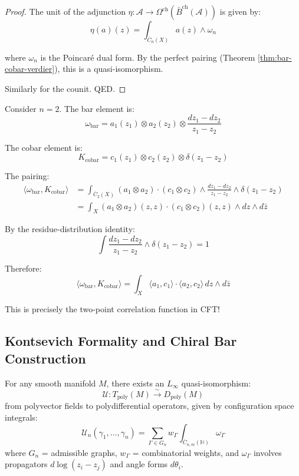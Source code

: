 \begin{proof}
The unit of the adjunction $\eta: \mathcal{A} \to \Omega^{\text{ch}}(\bar{B}^{\text{ch}}(\mathcal{A}))$ 
is given by:
$$\eta(a)(z) = \int_{\overline{C}_n(X)} a(z) \wedge \omega_n$$

where $\omega_n$ is the Poincaré dual form. By the perfect pairing (Theorem 
\ref{thm:bar-cobar-verdier}), this is a quasi-isomorphism.

Similarly for the counit. QED.
\end{proof}

\begin{example}\label{ex:pairing-two-point}

Consider $n=2$. The bar element is:
$$\omega_{\text{bar}} = a_1(z_1) \otimes a_2(z_2) \otimes \frac{dz_1 - dz_2}{z_1 - z_2}$$

The cobar element is:
$$K_{\text{cobar}} = c_1(z_1) \otimes c_2(z_2) \otimes \delta(z_1 - z_2)$$

The pairing:
\begin{align*}
\langle \omega_{\text{bar}}, K_{\text{cobar}} \rangle &= \int_{\overline{C}_2(X)} 
(a_1 \otimes a_2) \cdot (c_1 \otimes c_2) \wedge \frac{dz_1 - dz_2}{z_1 - z_2} 
\wedge \delta(z_1 - z_2) \\
&= \int_X (a_1 \otimes a_2)(z, z) \cdot (c_1 \otimes c_2)(z, z) \wedge dz \wedge d\bar{z}
\end{align*}

By the residue-distribution identity:
$$\int \frac{dz_1 - dz_2}{z_1 - z_2} \wedge \delta(z_1 - z_2) = 1$$

Therefore:
$$\langle \omega_{\text{bar}}, K_{\text{cobar}} \rangle = \int_X \langle a_1, c_1 
\rangle \cdot \langle a_2, c_2 \rangle \, dz \wedge d\bar{z}$$

This is precisely the two-point correlation function in CFT!
\end{example}

\subsection{Kontsevich Formality and Chiral Bar Construction}

\begin{theorem}\label{thm:kontsevich-formality}
\cite{Kon99} For any smooth manifold $M$, there exists an $L_\infty$ 
quasi-isomorphism:
$$\mathcal{U}: T_{\text{poly}}(M) \xrightarrow{\sim} D_{\text{poly}}(M)$$
from polyvector fields to polydifferential operators, given by configuration space integrals:
$$\mathcal{U}_n(\gamma_1, \ldots, \gamma_n) = \sum_{\Gamma \in G_n} w_\Gamma 
\int_{\overline{C}_{n,m}(\mathbb{H})} \omega_\Gamma$$
where $G_n$ = admissible graphs, $w_\Gamma$ = combinatorial weights, and 
$\omega_\Gamma$ involves propagators $d\log(z_i - z_j)$ and angle forms $d\theta_i$.
\end{theorem}


